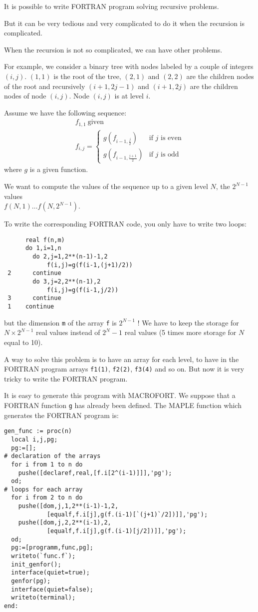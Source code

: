 It is possible to write FORTRAN program solving recursive problems.

But it can be very tedious and very complicated to do it when the
recursion is complicated.

When the recursion is not so complicated, we can have other problems.

For example, we consider a binary tree with nodes labeled by a couple
of integers $(i,j)$. $(1,1)$ is the root of the tree, $(2,1)$ and $(2,2)$
are the children nodes of the root and recursively $(i+1,2j-1)$ and
$(i+1,2j)$ are the children nodes of node $(i,j)$. Node $(i,j)$ is
at level $i$.

Assume we have the following sequence:
\[ \begin{array}{l}
f_{1,1}\ \mbox{given}\\
f_{i,j}=\left\{ \begin{array}{ll}
  g(f_{i-1,\frac{j}{2}}) & \mbox{if $j$ is even}\\
  g(f_{i-1,\frac{j+1}{2}}) & \mbox{if $j$ is odd} \end{array} \right.
\end{array} \]
where $g$ is a given function.

We want to compute the values of the sequence up to a given level $N$, \ie
the $2^{N-1}$ values\\ $f(N,1) \ldots f(N,2^{N-1})$.

To write the corresponding FORTRAN code, you only have to write
two loops:
\begin{verbatim}
      real f(n,m)
      do 1,i=1,n
        do 2,j=1,2**(n-1)-1,2
            f(i,j)=g(f(i-1,(j+1)/2))
 2      continue
        do 3,j=2,2**(n-1),2
            f(i,j)=g(f(i-1,j/2))
 3      continue
 1    continue
\end{verbatim}
but the dimension {\tt m} of the array {\tt f} is $2^{N-1}$ ! 
We have to keep the
storage for $N \times 2^{N-1}$ real values instead of $2^N-1$ real 
values (5 times 
more storage for $N$ equal to 10).

A way to solve this problem is to have an array for each level, \ie
to have in the FORTRAN program arrays {\tt f1(1)}, {\tt f2(2)},
{\tt f3(4)} and so on. But now it is very tricky to write the
FORTRAN program.

It is easy to generate this program with MACROFORT.
We suppose that a FORTRAN function {\tt g} has already been defined.
The MAPLE function which generates the FORTRAN program is:
\begin{verbatim}
gen_func := proc(n)
  local i,j,pg;
  pg:=[];
# declaration of the arrays
  for i from 1 to n do
    pushe([declaref,real,[f.i[2^(i-1)]]],'pg');
  od;
# loops for each array
  for i from 2 to n do
    pushe([dom,j,1,2**(i-1)-1,2,
            [equalf,f.i[j],g(f.(i-1)[`(j+1)`/2])]],'pg');
    pushe([dom,j,2,2**(i-1),2,
            [equalf,f.i[j],g(f.(i-1)[j/2])]],'pg');
  od;
  pg:=[programm,func,pg];
  writeto(`func.f`);
  init_genfor();
  interface(quiet=true);
  genfor(pg);
  interface(quiet=false);
  writeto(terminal);
end:
\end{verbatim}

